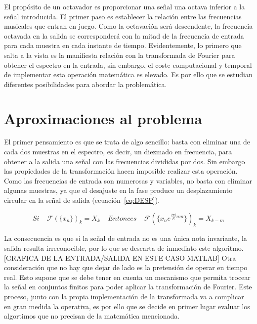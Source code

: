 El propósito de un octavador es proporcionar una señal una octava inferior a la señal introducida. El primer paso es establecer la relación entre las frecuencias musicales que entran en juego. Como la octavación será descendente, la frecuencia octavada en la salida se corresponderá con la mitad de la frecuencia de entrada para cada muestra en cada instante de tiempo.
Evidentemente, lo primero que salta a la vista es la manifiesta relación con la transformada de Fourier para obtener el espectro en la entrada, sin embargo, el coste computacional y temporal de implementar esta operación matemática es elevado. Es por ello que se estudian diferentes posibilidades para abordar la problemática.
\section{Aproximaciones al problema}
El primer pensamiento es que se trata de algo sencillo: basta con eliminar una de cada dos muestras en el espectro, es decir, un diezmado en frecuencia, para obtener a la salida una señal con las frecuencias divididas por dos. Sin embargo las propiedades de la transformación hacen imposible realizar esta operación.
Como las frecuencias de entrada son numerosas y variables, no basta con eliminar algunas muestras, ya que el desajuste en la fase produce un desplazamiento circular en la señal de salida (ecuación~\ref{eq:DESP}). 

\begin{equation}
\label{eq:DESP}
Si~~~~~\mathscr{F}(\{x_{n}\})_{k} = X_{k}~~~~~Entonces~~~~~\mathscr{F}(\{x_{n}e^{\frac{2\pi i}{N}nm}\})_{k}= X_{k-m} 
\end{equation}

La consecuencia es que si la señal de entrada no es una única nota invariante, la salida resulta irreconocible, por lo que se descarta  de inmediato este algoritmo. [GRAFICA DE LA ENTRADA/SALIDA EN ESTE CASO MATLAB] Otra consideración que no hay que dejar de lado es la pretensión de operar en tiempo real. Esto supone que se debe tener en cuenta un mecanismo que permita trocear la señal en conjuntos finitos para poder aplicar la transformación de Fourier. Este proceso, junto con la propia implementación de la transformada va a complicar en gran medida la operativa, es por ello que se decide en primer lugar evaluar los algortimos que no precisan de la matemática mencionada.

